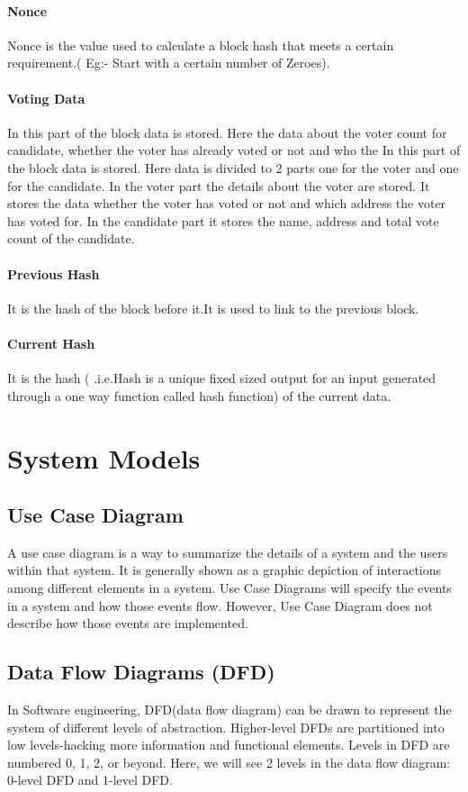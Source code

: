 \documentclass[a4paper,12pt]{report}
\begin{document}
\paragraph{Nonce}
Nonce is the value used to calculate a block hash that meets a certain requirement.( Eg:- Start with a certain number of Zeroes).

\paragraph{Voting Data}
In this part of the block data is stored. Here the data about the voter count for candidate, whether the voter has already voted or not  and who the 
In this part of the block data is stored. Here data is divided to 2 parts one for the voter and one for the candidate. In the voter part the details about the voter are stored. It stores the data whether the voter has voted or not and which address the voter has voted for. In the candidate part it stores the name, address and total vote count of the candidate.

\paragraph{Previous Hash}
It is the hash of the block before it.It is used to link to the previous block.

\paragraph{Current Hash}
It is the hash ( .i.e.Hash is a unique fixed sized output for an input generated through a one way function called hash function) of the current data.

\section{System Models}
\subsection{Use Case Diagram}
A use case diagram is a way to summarize the details of a system and the users within that system. It is generally shown as a graphic depiction of interactions among different elements in a system. Use Case Diagrams will specify the events in a system and how those events flow. However, Use Case Diagram does not describe how those events are implemented.

\subsection{Data Flow Diagrams (DFD)}
In Software engineering, DFD(data flow diagram) can be drawn to represent the system of different levels of abstraction. Higher-level DFDs are partitioned into low levels-hacking more information and functional elements. Levels in DFD are numbered 0, 1, 2, or beyond. Here, we will see 2 levels in the data flow diagram: 0-level DFD and 1-level DFD.
\end{document}
